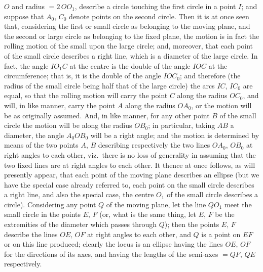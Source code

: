 \documentclass[11pt]{article}
\begin{document}
$O$ and radius $= 2\,OO_1$, describe a circle touching the first circle in a point $I$; and suppose
that $A_0$, $C_0$ denote points on the second circle. Then it is at once seen that, considering
the first or small circle as belonging to the moving plane, and the second or large
circle as belonging to the fixed plane, the motion is in fact the rolling motion of
the small upon the large circle; and, moreover, that each point of the small circle
describes a right line, which is a diameter of the large circle. In fact, the angle
$IO_1 C$ at the centre is the double of the angle $IOC$ at the circumference; that is,
it is the double of the angle $IOC_0$; and therefore (the radius of the small circle
being half that of the large circle) the arcs $IC$, $IC_0$ are equal, so that the rolling
motion will carry the point $C$ along the radius $OC_0$, and will, in like manner, carry
the point $A$ along the radius $OA_0$, or the motion will be as originally assumed.
And, in like manner, for any other point $B$ of the small circle the motion will be
along the radius $OB_0$; in particular, taking $AB$ a diameter, the angle $A_0 O B_0$ will be
a right angle; and the motion is determined by means of the two points $A,\,B$
describing respectively the two lines $OA_0$, $OB_0$ at right angles to each other, viz.\
there is no loss of generality in assuming that the two fixed lines are at right
angles to each other. It thence at once follows, as will presently appear, that each
point of the moving plane describes an ellipse (but we have the special case already
referred to, each point on the small circle describes a right line, and also the special
case, the centre $O_1$ of the small circle describes a circle). Considering any point $Q$
of the moving plane, let the line $QO_1$ meet the small circle in the points $E,\,F$ (or,
what is the same thing, let $E,\,F$ be the extremities of the diameter which passes
through $Q$); then the points $E,\,F$ describe the lines $OE,\,OF$ at right angles to
each other, and $Q$ is a point on $EF$ or on this line produced; clearly the locus is
an ellipse having the lines $OE,\,OF$ for the directions of its axes, and having the
lengths of the semi-axes $= QF,\,QE$ respectively.
\end{document}
